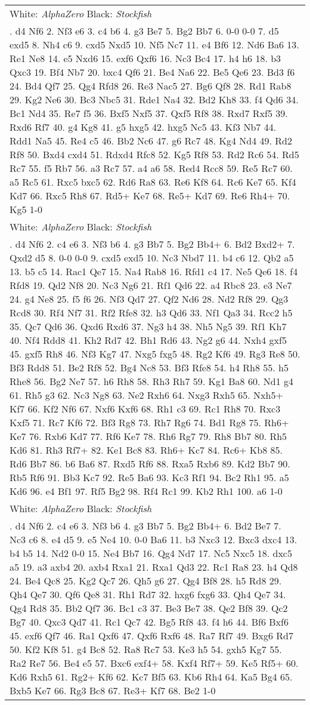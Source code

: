 \documentclass[12pt]{article}
\begin{document}
\begin{small}
\begin{longtable}{p{\textwidth}}
\hline
White: \emph{AlphaZero} Black: \emph{Stockfish} \\\nopagebreak
1. d4 Nf6 2. Nf3 e6 3. c4 b6 4. g3 Be7 5. Bg2 Bb7 6. 0-0 0-0 7. d5 exd5 8. Nh4 c6 9. cxd5 Nxd5 10. Nf5 Nc7 11. e4 Bf6 12. Nd6 Ba6 13. Re1 Ne8 14. e5 Nxd6 15. exf6 Qxf6 16. Nc3 Bc4 17. h4 h6 18. b3 Qxc3 19. Bf4 Nb7 20. bxc4 Qf6 21. Be4 Na6 22. Be5 Qe6 23. Bd3 f6 24. Bd4 Qf7 25. Qg4 Rfd8 26. Re3 Nac5 27. Bg6 Qf8 28. Rd1 Rab8 29. Kg2 Ne6 30. Bc3 Nbc5 31. Rde1 Na4 32. Bd2 Kh8 33. f4 Qd6 34. Bc1 Nd4 35. Re7 f5 36. Bxf5 Nxf5 37. Qxf5 Rf8 38. Rxd7 Rxf5 39. Rxd6 Rf7 40. g4 Kg8 41. g5 hxg5 42. hxg5 Nc5 43. Kf3 Nb7 44. Rdd1 Na5 45. Re4 c5 46. Bb2 Nc6 47. g6 Rc7 48. Kg4 Nd4 49. Rd2 Rf8 50. Bxd4 cxd4 51. Rdxd4 Rfc8 52. Kg5 Rf8 53. Rd2 Rc6 54. Rd5 Rc7 55. f5 Rb7 56. a3 Rc7 57. a4 a6 58. Red4 Rcc8 59. Re5 Rc7 60. a5 Rc5 61. Rxc5 bxc5 62. Rd6 Ra8 63. Re6 Kf8 64. Rc6 Ke7 65. Kf4 Kd7 66. Rxc5 Rh8 67. Rd5+ Ke7 68. Re5+ Kd7 69. Re6 Rh4+ 70. Kg5 1-0 \\
\hline
White: \emph{AlphaZero} Black: \emph{Stockfish} \\\nopagebreak
1. d4 Nf6 2. c4 e6 3. Nf3 b6 4. g3 Bb7 5. Bg2 Bb4+ 6. Bd2 Bxd2+ 7. Qxd2 d5 8. 0-0 0-0 9. cxd5 exd5 10. Nc3 Nbd7 11. b4 c6 12. Qb2 a5 13. b5 c5 14. Rac1 Qe7 15. Na4 Rab8 16. Rfd1 c4 17. Ne5 Qe6 18. f4 Rfd8 19. Qd2 Nf8 20. Nc3 Ng6 21. Rf1 Qd6 22. a4 Rbc8 23. e3 Ne7 24. g4 Ne8 25. f5 f6 26. Nf3 Qd7 27. Qf2 Nd6 28. Nd2 Rf8 29. Qg3 Rcd8 30. Rf4 Nf7 31. Rf2 Rfe8 32. h3 Qd6 33. Nf1 Qa3 34. Rcc2 h5 35. Qc7 Qd6 36. Qxd6 Rxd6 37. Ng3 h4 38. Nh5 Ng5 39. Rf1 Kh7 40. Nf4 Rdd8 41. Kh2 Rd7 42. Bh1 Rd6 43. Ng2 g6 44. Nxh4 gxf5 45. gxf5 Rh8 46. Nf3 Kg7 47. Nxg5 fxg5 48. Rg2 Kf6 49. Rg3 Re8 50. Bf3 Rdd8 51. Be2 Rf8 52. Bg4 Nc8 53. Bf3 Rfe8 54. h4 Rh8 55. h5 Rhe8 56. Bg2 Ne7 57. h6 Rh8 58. Rh3 Rh7 59. Kg1 Ba8 60. Nd1 g4 61. Rh5 g3 62. Nc3 Ng8 63. Ne2 Rxh6 64. Nxg3 Rxh5 65. Nxh5+ Kf7 66. Kf2 Nf6 67. Nxf6 Kxf6 68. Rh1 c3 69. Rc1 Rh8 70. Rxc3 Kxf5 71. Rc7 Kf6 72. Bf3 Rg8 73. Rh7 Rg6 74. Bd1 Rg8 75. Rh6+ Ke7 76. Rxb6 Kd7 77. Rf6 Ke7 78. Rh6 Rg7 79. Rh8 Bb7 80. Rh5 Kd6 81. Rh3 Rf7+ 82. Ke1 Bc8 83. Rh6+ Kc7 84. Rc6+ Kb8 85. Rd6 Bb7 86. b6 Ba6 87. Rxd5 Rf6 88. Rxa5 Rxb6 89. Kd2 Bb7 90. Rb5 Rf6 91. Bb3 Kc7 92. Re5 Ba6 93. Kc3 Rf1 94. Bc2 Rh1 95. a5 Kd6 96. e4 Bf1 97. Rf5 Bg2 98. Rf4 Rc1 99. Kb2 Rh1 100. a6 1-0 \\
\hline
White: \emph{AlphaZero} Black: \emph{Stockfish} \\\nopagebreak
1. d4 Nf6 2. c4 e6 3. Nf3 b6 4. g3 Bb7 5. Bg2 Bb4+ 6. Bd2 Be7 7. Nc3 c6 8. e4 d5 9. e5 Ne4 10. 0-0 Ba6 11. b3 Nxc3 12. Bxc3 dxc4 13. b4 b5 14. Nd2 0-0 15. Ne4 Bb7 16. Qg4 Nd7 17. Nc5 Nxc5 18. dxc5 a5 19. a3 axb4 20. axb4 Rxa1 21. Rxa1 Qd3 22. Rc1 Ra8 23. h4 Qd8 24. Be4 Qc8 25. Kg2 Qc7 26. Qh5 g6 27. Qg4 Bf8 28. h5 Rd8 29. Qh4 Qe7 30. Qf6 Qe8 31. Rh1 Rd7 32. hxg6 fxg6 33. Qh4 Qe7 34. Qg4 Rd8 35. Bb2 Qf7 36. Bc1 c3 37. Be3 Be7 38. Qe2 Bf8 39. Qc2 Bg7 40. Qxc3 Qd7 41. Rc1 Qc7 42. Bg5 Rf8 43. f4 h6 44. Bf6 Bxf6 45. exf6 Qf7 46. Ra1 Qxf6 47. Qxf6 Rxf6 48. Ra7 Rf7 49. Bxg6 Rd7 50. Kf2 Kf8 51. g4 Bc8 52. Ra8 Rc7 53. Ke3 h5 54. gxh5 Kg7 55. Ra2 Re7 56. Be4 e5 57. Bxc6 exf4+ 58. Kxf4 Rf7+ 59. Ke5 Rf5+ 60. Kd6 Rxh5 61. Rg2+ Kf6 62. Kc7 Bf5 63. Kb6 Rh4 64. Ka5 Bg4 65. Bxb5 Ke7 66. Rg3 Bc8 67. Re3+ Kf7 68. Be2 1-0 \\

\end{longtable}
\end{small}
\end{document}

